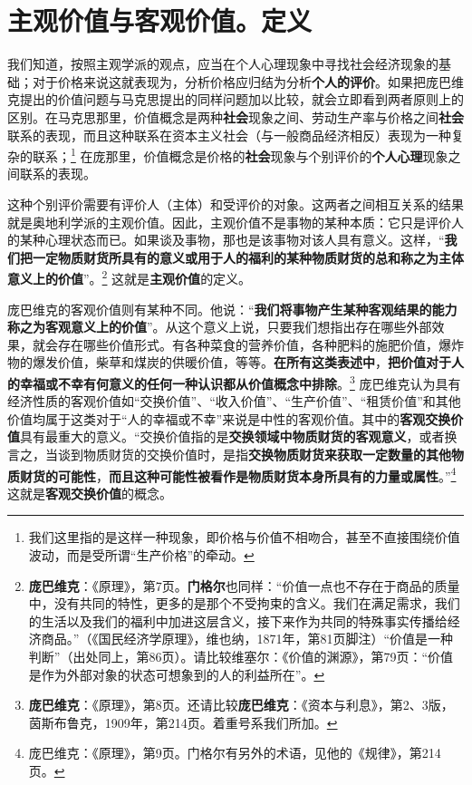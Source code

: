 \documentclass[fontset=fandol, a4paper, 12pt, openright]{ctexbook}
\begin{document}
\section{主观价值与客观价值。定义}

我们知道，按照主观学派的观点，应当在个人心理现象中寻找社会经济现象的基础；对于价格来说这就表现为，分析价格应归结为分析\textbf{个人的评价}。如果把庞巴维克提出的价值问题与马克思提出的同样问题加以比较，就会立即看到两者原则上的区别。在马克思那里，价值概念是两种\textbf{社会}现象之间、劳动生产率与价格之间\textbf{社会}联系的表现，而且这种联系在资本主义社会（与一般商品经济相反）表现为一种复杂的联系；\footnote{我们这里指的是这样一种现象，即价格与价值不相吻合，甚至不直接围绕价值波动，而是受所谓“生产价格”的牵动。} 在庞那里，价值概念是价格的\textbf{社会}现象与个别评价的\textbf{个人心理}现象之间联系的表现。

这种个别评价需要有评价人（主体）和受评价的对象。这两者之间相互关系的结果就是奥地利学派的主观价值。因此，主观价值不是事物的某种本质：它只是评价人的某种心理状态而已。如果谈及事物，那也是该事物对该人具有意义。这样，“\textbf{我们把一定物质财货所具有的意义或用于人的福利的某种物质财货的总和称之为主体意义上的价值}”。\footnote{\textbf{庞巴维克}：《原理》，第7页。\textbf{门格尔}也同样：“价值一点也不存在于商品的质量中，没有共同的特性，更多的是那个不受拘束的含义。我们在满足需求，我们的生活以及我们的福利中加进这层含义，接下来作为共同的特殊事实传播给经济商品。”（《国民经济学原理》，维也纳，1871年，第81页脚注）“价值是一种判断”（出处同上，第86页）。请比较维塞尔：《价值的渊源》，第79页：“价值是作为外部对象的状态可想象到的人的利益所在”。} 这就是\textbf{主观价值}的定义。

庞巴维克的客观价值则有某种不同。他说：“\textbf{我们将事物产生某种客观结果的能力称之为客观意义上的价值}”。从这个意义上说，只要我们想指出存在哪些外部效果，就会存在哪些价值形式。有各种菜食的营养价值，各种肥料的施肥价值，爆炸物的爆发价值，柴草和煤炭的供暖价值，等等。\textbf{在所有这类表述中}，\textbf{把价值对于人的幸福或不幸有何意义的任何一种认识都从价值概念中排除}。\footnote{\textbf{庞巴维克}：《原理》，第8页。还请比较\textbf{庞巴维克}：《资本与利息》，第2、3版，茵斯布鲁克，1909年，第214页。着重号系我们所加。} 庞巴维克认为具有经济性质的客观价值如“交换价值”、“收入价值”、“生产价值”、“租赁价值”和其他价值均属于这类对于“人的幸福或不幸”来说是中性的客观价值。其中的\textbf{客观交换价值}具有最重大的意义。“交换价值指的是\textbf{交换领域中物质财货的客观意义}，或者换言之，当谈到物质财货的交换价值时，是指\textbf{交换物质财货来获取一定数量的其他物质财货的可能性}，\textbf{而且这种可能性被看作是物质财货本身所具有的力量或属性}。”\footnote{庞巴维克：《原理》，第9页。门格尔有另外的术语，见他的《规律》，第214页。} 这就是\textbf{客观交换价值}的概念。
\end{document}
